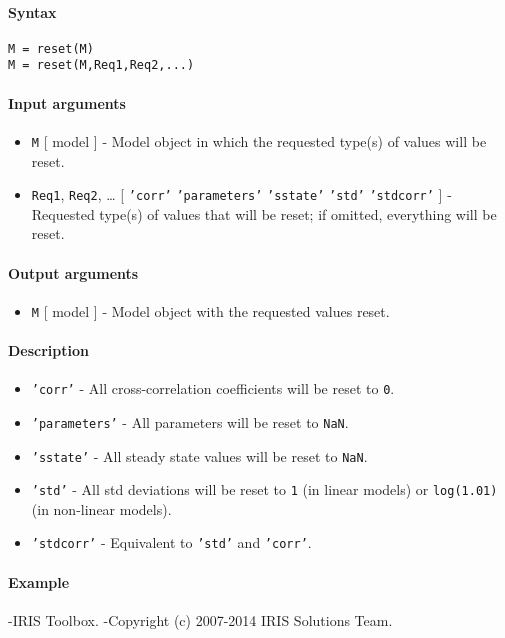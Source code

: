 


	\paragraph{Syntax}

\begin{verbatim}
M = reset(M)
M = reset(M,Req1,Req2,...)
\end{verbatim}

\paragraph{Input arguments}

\begin{itemize}
\item
  \texttt{M} {[} model {]} - Model object in which the requested type(s)
  of values will be reset.
\item
  \texttt{Req1}, \texttt{Req2}, \ldots{} {[} \texttt{'corr'} \textbar{}
  \texttt{'parameters'} \textbar{} \texttt{'sstate'} \textbar{}
  \texttt{'std'} \textbar{} \texttt{'stdcorr'} {]} - Requested type(s)
  of values that will be reset; if omitted, everything will be reset.
\end{itemize}

\paragraph{Output arguments}

\begin{itemize}
\itemsep1pt\parskip0pt
\item
  \texttt{M} {[} model {]} - Model object with the requested values
  reset.
\end{itemize}

\paragraph{Description}

\begin{itemize}
\item
  \texttt{'corr'} - All cross-correlation coefficients will be reset to
  \texttt{0}.
\item
  \texttt{'parameters'} - All parameters will be reset to \texttt{NaN}.
\item
  \texttt{'sstate'} - All steady state values will be reset to
  \texttt{NaN}.
\item
  \texttt{'std'} - All std deviations will be reset to \texttt{1} (in
  linear models) or \texttt{log(1.01)} (in non-linear models).
\item
  \texttt{'stdcorr'} - Equivalent to \texttt{'std'} and \texttt{'corr'}.
\end{itemize}

\paragraph{Example}

-IRIS Toolbox. -Copyright (c) 2007-2014 IRIS Solutions Team.


